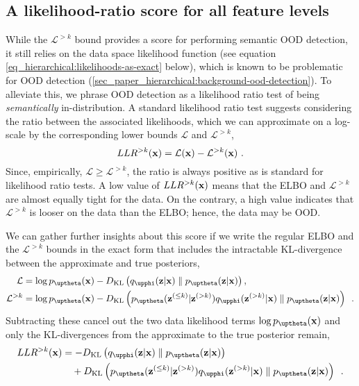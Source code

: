 {\subsection{A likelihood-ratio score for all feature levels}
While the $\mathcal{L}^{>k}$ bound provides a score for performing semantic OOD detection, it still relies on the data space likelihood function (see equation \cref{eq_hierarchical:likelihoods-as-exact} below), which is known to be problematic for OOD detection (\cref{sec_paper_hierarchical:background-ood-detection}). To alleviate this, we phrase OOD detection as a likelihood ratio test of being \emph{semantically} in-distribution.
A standard likelihood ratio test \parencite{buse_likelihood_1982} suggests considering the ratio between the associated likelihoods, which we can approximate on a log-scale by the corresponding lower bounds $\mathcal{L}$ and $\mathcal{L}^{>k}$,
\begin{equation}\label{eq_hierarchical:llr-as-difference-in-likelihoods}
    LLR^{>k}(\xb) = \mathcal{L}(\xb) - \mathcal{L}^{>k}(\xb) \ .
\end{equation}
Since, empirically, $\mathcal{L}\geq\mathcal{L}^{>k}$, the ratio is always positive as is standard for likelihood ratio tests.
A low value of $LLR^{>k}({\mathbf{x}})$ means that the ELBO and $\mathcal{L}^{>k}$ are almost equally tight for the data.
On the contrary, a high value indicates that $\mathcal{L}^{>k}$ is looser on the data than the ELBO; hence, the data may be OOD.


We can gather further insights about this score if we write the regular ELBO and the $\mathcal{L}^{>k}$ bounds in the exact form that includes the intractable KL-divergence between the approximate and true posteriors,
\begin{align}
    \mathcal{L}      &= \log p_\thetab(\xb) - D_{\mathrm{KL}}\left( q_\phib(\zb|\xb) \parallel p_\thetab(\zb|\xb)\right), \label{eq_hierarchical:likelihoods-as-exact} \\ 
    \mathcal{L}^{>k} &= \log p_\thetab(\xb) - D_{\mathrm{KL}}\left( p_\thetab(\zb^{(\leq k)}|\zb^{(>k)}) q_\phib(\zb^{(>k)}|\xb) \parallel p_\thetab(\zb|\xb)\right) \nonumber \enspace .
\end{align}
Subtracting these cancel out the two data likelihood terms $\log p_\thetab(\xb)$ and only the KL-divergences from the approximate to the true posterior remain,
\begin{align}\label{eq_hierarchical:llr-as-kls}
    LLR^{>k}(\xb) &= - D_{\mathrm{KL}}\left( q_\phib(\zb|\xb) \parallel p_\thetab(\zb|\xb)\right) \\
                 &\quad + D_{\mathrm{KL}}\left( p_\thetab(\zb^{(\leq k)}|\zb^{(>k)}) q_\phib(\zb^{(>k)}|\xb) \parallel p_\thetab(\zb|\xb)\right) \enspace . \notag
\end{align}

}
